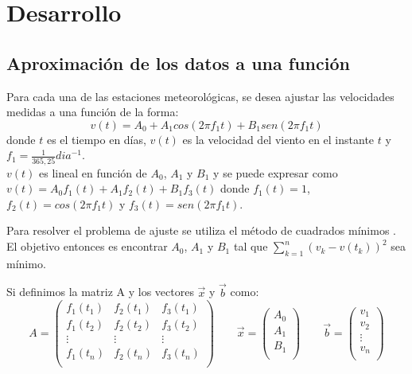 \documentclass[journal, monochrome]{IEEEtran}
\begin{document}
\section{Desarrollo}
\label{section:development}
\vspace{0.5cm}
\subsection{Aproximación de los datos a una función}
\par
Para cada una de las estaciones meteorológicas, se desea ajustar las velocidades medidas a una función de la forma:
\begin{equation}
v(t) = A_{0} + A_{1}cos(2\pi f_{1}t) + B_{1}sen(2\pi f_{1}t)
\label{equation:model}
\end{equation}
donde $t$ es el tiempo en días, $v(t)$ es la velocidad del viento en el instante $t$ y $f_{1} = \frac{1}{365,25} dia^{-1}$. \\
$v(t)$ es lineal en función de $A_{0}$, $A_{1}$ y $B_{1}$ y se puede expresar como $v(t) = A_{0}f_{1}(t) + A_{1}f_{2}(t) + B_{1}f_{3}(t)$ donde $f_{1}(t) = 1$, $f_{2}(t) = cos(2\pi f_{1}t)$ y $f_{3}(t) = sen(2\pi f_{1}t)$.
\par
Para resolver el problema de ajuste se utiliza el método de cuadrados mínimos \citep{mathews}. El objetivo entonces es encontrar $A_{0}$, $A_{1}$ y $B_{1}$ tal que 
$\sum_{k=1}^{n} (v_{k} - v(t_{k}))^{2} $ sea mínimo.
\par
Si definimos la matriz A y los vectores $\vec{x}$ y $\vec{b}$ como:
\begin{equation}
A = \left(\begin{array}{ccc}
f_{1}(t_{1}) & f_{2}(t_{1}) & f_{3}(t_{1}) \\
f_{1}(t_{2}) & f_{2}(t_{2}) & f_{3}(t_{2}) \\
\vdots & \vdots & \vdots \\
f_{1}(t_{n}) & f_{2}(t_{n}) & f_{3}(t_{n}) \\
\end{array} \right) \qquad
\vec{x} = \left(\begin{array}{c}
A_{0} \\
A_{1} \\
B_{1} \\
\end{array} \right) \qquad
\vec{b} = \left(\begin{array}{c}
v_{1} \\
v_{2} \\
\vdots \\
v_{n} \\
\end{array} \right)
\end{equation}
\end{document}
